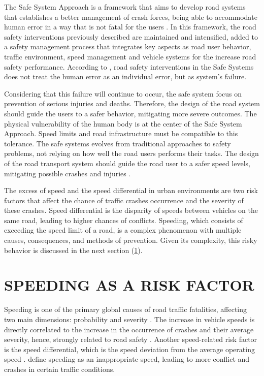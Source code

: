 The Safe System Approach is a framework that aims to develop road systems that establishes a better management of crash forces, being able to accommodate human error in a way that is not fatal for the users \cite{international_transport_forum_towards_2008}. In this framework, the road safety interventions previously described are maintained and intensified, added to a safety management process that integrates key aspects as road user behavior, traffic environment, speed management and vehicle systems for the increase road safety performance. According to \textcite{larssonSafeSystemApproach2013}, road safety interventions in the Safe Systems does not treat the human error as an individual error, but as system's failure. 

Considering that this failure will continue to occur, the safe system focus on prevention of serious injuries and deaths. Therefore, the design of the road system should guide the users to a safer behavior, mitigating more severe outcomes. The physical vulnerability of the human body is at the center of the Safe System Approach. Speed limits and road infrastructure must be compatible to this tolerance. The safe systems evolves from traditional approaches to safety problems, not relying on how well the road users performs their tasks. The design of the road transport system should guide the road user to a safer speed levels, mitigating possible crashes and injuries \cite{international_transport_forum_towards_2008,wegmanFutureRoadSafety2017}. 

The excess of speed and the speed differential in urban environments are two risk factors that affect the chance of traffic crashes occurrence and the severity of these crashes. Speed differential is the disparity of speeds between vehicles on the same road, leading to higher chances of conflicts. Speeding, which consists of exceeding the speed limit of a road, is a complex phenomenon with multiple causes, consequences, and methods of prevention. Given its complexity, this risky behavior is discussed in the next section (\ref{speeding}). 

\section{SPEEDING AS A RISK FACTOR} \label{speeding}

Speeding is one of the primary global causes of road traffic fatalities, affecting two main dimensions: probability and severity \cite{WHO2013}. The increase in vehicle speeds is directly correlated to the increase in the occurrence of crashes and their average severity, hence, strongly related to road safety \cite{Mohan2016a}. Another speed-related risk factor is the speed differential, which is the speed deviation from the average operating speed \cite{Shinar2017}. \textcite{Ferraz2012} define speeding as an inappropriate speed, leading to more conflict and crashes in certain traffic conditions. 

